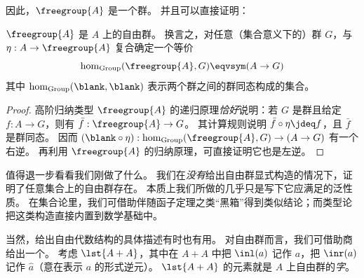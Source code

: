 因此，$\freegroup{A}$ 是一个群。
并且可以直接证明：

\begin{thm}
  $\freegroup{A}$ 是 $A$ 上的自由群。
  换言之，对任意（集合意义下的）群 $G$，与 $\eta:A\to \freegroup{A}$ 复合确定一个等价
  \[ \hom_{\mathrm{Group}}(\freegroup{A},G) \eqvsym (A\to G) \]
  其中 $\hom_{\mathrm{Group}}(\blank,\blank)$ 表示两个群之间的群同态构成的集合。
\end{thm}
\begin{proof}
  高阶归纳类型 $\freegroup{A}$ 的递归原理\emph{恰好}说明：若 $G$ 是群且给定 $f:A\to G$，则有 $\bar{f}:\freegroup{A} \to G$。
  其计算规则说明 $\bar{f}\circ \eta \jdeq f$，且 $\bar f$ 是群同态。
  因而 $(\blank\circ \eta) :  \hom_{\mathrm{Group}}(\freegroup{A},G) \to (A\to G)$ 有一个右逆。
  再利用 $\freegroup{A}$ 的归纳原理，可直接证明它也是左逆。
\end{proof}

值得退一步看看我们刚做了什么。
我们在\emph{没有}给出自由群显式构造的情况下，证明了任意集合上的自由群存在。
本质上我们所做的几乎只是写下它应满足的泛性质。
在集合论里，我们可借助伴随函子定理之类“黑箱”得到类似结论；而类型论把这类构造直接内置到数学基础中。

当然，给出自由代数结构的具体描述有时也有用。
对自由群而言，我们可借助商给出一个。
考虑 $\lst{A+A}$，其中在 $A+A$ 中把 $\inl(a)$ 记作 $a$，把 $\inr(a)$ 记作 $\hat{a}$（意在表示 $a$ 的形式逆元）。
$\lst{A+A}$ 的元素就是 $A$ 上自由群的\emph{字}。

